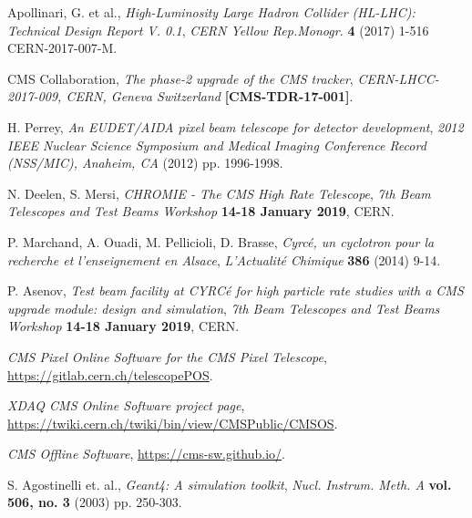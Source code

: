 \documentclass[a4paper,11pt]{article}
\begin{document}
\begin{thebibliography}{99}
	
\justifying
		
Apollinari, G. et al., \emph{High-Luminosity Large Hadron Collider (HL-LHC): Technical Design Report V. 0.1}, \emph{CERN Yellow Rep.Monogr.} {\bf 4} (2017) 1-516 CERN-2017-007-M.

CMS Collaboration, \emph{The phase-2 upgrade of the CMS tracker}, \emph{CERN-LHCC-2017-009, CERN, Geneva Switzerland} {\bf [CMS-TDR-17-001]}.

H. Perrey, \emph{An EUDET/AIDA pixel beam telescope for detector development}, \emph{2012 IEEE Nuclear Science Symposium and Medical Imaging Conference Record (NSS/MIC), Anaheim, CA} (2012) pp. 1996-1998.

N. Deelen, S. Mersi, \emph{CHROMIE - The CMS High Rate Telescope}, \emph{7th Beam Telescopes and Test Beams Workshop} {\bf 14-18 January 2019}, CERN.

P. Marchand, A. Ouadi, M. Pellicioli, D. Brasse, \emph{Cyrcé, un cyclotron pour la recherche et l’enseignement en Alsace}, \emph{L’Actualité Chimique} {\bf 386} (2014) 9-14.

P. Asenov, \emph{Test beam facility at CYRCé for high particle rate studies with a CMS upgrade module: design and simulation}, \emph{7th Beam Telescopes and Test Beams Workshop} {\bf 14-18 January 2019}, CERN.

\emph{CMS Pixel Online Software for the CMS Pixel Telescope}, \href{https://gitlab.cern.ch/telescopePOS} {https://gitlab.cern.ch/telescopePOS}.

\emph{XDAQ CMS Online Software project page}, \href{https://twiki.cern.ch/twiki/bin/view/CMSPublic/CMSOS} {https://twiki.cern.ch/twiki/bin/view/CMSPublic/CMSOS}.

\emph{CMS Offline Software}, \href{https://cms-sw.github.io/} {https://cms-sw.github.io/}.

S. Agostinelli et. al., \emph{Geant4: A simulation toolkit}, \emph{Nucl. Instrum. Meth. A} {\bf vol. 506, no. 3} (2003) pp. 250-303.

\end{thebibliography}
\end{document}
